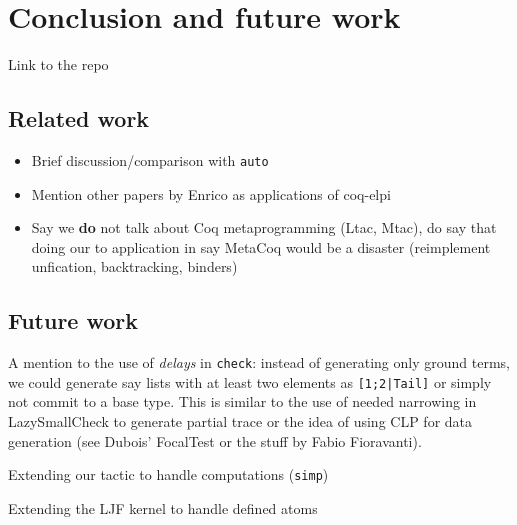 \section{Conclusion and future work}

Link to the repo
\subsection{Related work}
\label{ssec:rel}

\begin{itemize}
\item Brief discussion/comparison with \texttt{auto}
\item Mention other papers by Enrico as applications of coq-elpi
\item Say we \textbf{do} not talk about Coq metaprogramming (Ltac, Mtac), do say that doing our to application in say MetaCoq would be a disaster (reimplement unfication, backtracking, binders)
\end{itemize}

\subsection{Future work}
\label{ssec:fut}


A mention to the use of \emph{delays} in \texttt{check}: instead of generating only ground terms, we could generate say lists with at least two elements as \texttt{[1;2|Tail]} or simply not commit to a base type. This  is similar to the use of needed narrowing in LazySmallCheck to generate partial trace or the idea of using CLP for data generation (see Dubois' FocalTest or the stuff by Fabio Fioravanti).

Extending our tactic to handle computations (\texttt{simp})

Extending the LJF kernel to handle defined atoms
